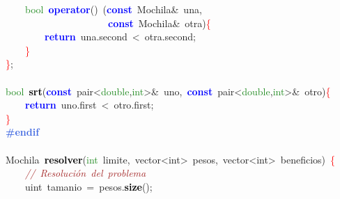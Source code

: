 \mbox{}\ \ \ \ \textcolor{ForestGreen}{bool}\ \textbf{\textcolor{Blue}{operator}}\textcolor{BrickRed}{()}\ \textcolor{BrickRed}{(}\textbf{\textcolor{Blue}{const}}\ Mochila\textcolor{BrickRed}{\&}\ una\textcolor{BrickRed}{,} \\
\mbox{}\ \ \ \ \ \ \ \ \ \ \ \ \ \ \ \ \ \ \ \ \ \textbf{\textcolor{Blue}{const}}\ Mochila\textcolor{BrickRed}{\&}\ otra\textcolor{BrickRed}{)}\textcolor{Red}{\{} \\
\mbox{}\ \ \ \ \ \ \ \ \textbf{\textcolor{Blue}{return}}\ una\textcolor{BrickRed}{.}second\ \textcolor{BrickRed}{\textless{}}\ otra\textcolor{BrickRed}{.}second\textcolor{BrickRed}{;} \\
\mbox{}\ \ \ \ \textcolor{Red}{\}} \\
\mbox{}\textcolor{Red}{\}}\textcolor{BrickRed}{;} \\
\mbox{} \\
\mbox{}\textcolor{ForestGreen}{bool}\ \textbf{\textcolor{Black}{srt}}\textcolor{BrickRed}{(}\textbf{\textcolor{Blue}{const}}\ pair\textcolor{BrickRed}{\textless{}}\textcolor{ForestGreen}{double}\textcolor{BrickRed}{,}\textcolor{ForestGreen}{int}\textcolor{BrickRed}{\textgreater{}\&}\ uno\textcolor{BrickRed}{,}\ \textbf{\textcolor{Blue}{const}}\ pair\textcolor{BrickRed}{\textless{}}\textcolor{ForestGreen}{double}\textcolor{BrickRed}{,}\textcolor{ForestGreen}{int}\textcolor{BrickRed}{\textgreater{}\&}\ otro\textcolor{BrickRed}{)}\textcolor{Red}{\{} \\
\mbox{}\ \ \ \ \textbf{\textcolor{Blue}{return}}\ uno\textcolor{BrickRed}{.}first\ \textcolor{BrickRed}{\textless{}}\ otro\textcolor{BrickRed}{.}first\textcolor{BrickRed}{;} \\
\mbox{}\textcolor{Red}{\}} \\
\mbox{}\textbf{\textcolor{RoyalBlue}{\#endif}} \\
\mbox{} \\
\mbox{}\textcolor{TealBlue}{Mochila}\ \textbf{\textcolor{Black}{resolver}}\textcolor{BrickRed}{(}\textcolor{ForestGreen}{int}\ limite\textcolor{BrickRed}{,}\ \textcolor{TealBlue}{vector\textless{}int\textgreater{}\ pesos,\ vector\textless{}int\textgreater{}}\ beneficios\textcolor{BrickRed}{)}\ \textcolor{Red}{\{} \\
\mbox{}\ \ \ \ \textit{\textcolor{Brown}{//\ Resolución\ del\ problema}} \\
\mbox{}\ \ \ \ \textcolor{TealBlue}{uint}\ tamanio\ \textcolor{BrickRed}{=}\ pesos\textcolor{BrickRed}{.}\textbf{\textcolor{Black}{size}}\textcolor{BrickRed}{();} \\
